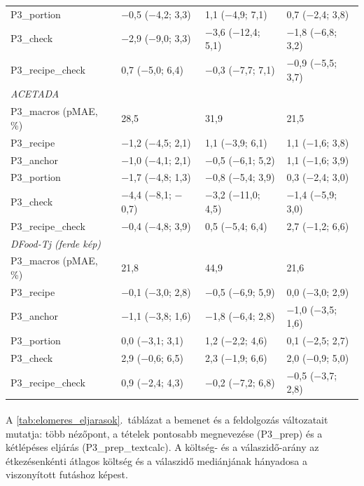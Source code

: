 \begin{table}[p]
{\begin{tabular}{llll}
P3\_portion & $-$0,5 ($-$4,2; 3,3) & 1,1 ($-$4,9; 7,1) & 0,7 ($-$2,4; 3,8) \\
P3\_check & $-$2,9 ($-$9,0; 3,3) & $-$3,6 ($-$12,4; 5,1) & $-$1,8 ($-$6,8; 3,2) \\
P3\_recipe\_check & 0,7 ($-$5,0; 6,4) & $-$0,3 ($-$7,7; 7,1) & $-$0,9 ($-$5,5; 3,7) \\
\hline
\multicolumn{4}{l}{\textit{ACETADA}} \\
P3\_macros (pMAE, \%) & 28,5 & 31,9 & 21,5 \\
P3\_recipe & $-$1,2 ($-$4,5; 2,1) & 1,1 ($-$3,9; 6,1) & 1,1 ($-$1,6; 3,8) \\
P3\_anchor & $-$1,0 ($-$4,1; 2,1) & $-$0,5 ($-$6,1; 5,2) & 1,1 ($-$1,6; 3,9) \\
P3\_portion & $-$1,7 ($-$4,8; 1,3) & $-$0,8 ($-$5,4; 3,9) & 0,3 ($-$2,4; 3,0) \\
P3\_check & $-$4,4 ($-$8,1; $-$0,7) & $-$3,2 ($-$11,0; 4,5) & $-$1,4 ($-$5,9; 3,0) \\
P3\_recipe\_check & $-$0,4 ($-$4,8; 3,9) & 0,5 ($-$5,4; 6,4) & 2,7 ($-$1,2; 6,6) \\
\hline
\multicolumn{4}{l}{\textit{DFood-Tj (ferde kép)}} \\
P3\_macros (pMAE, \%) & 21,8 & 44,9 & 21,6 \\
P3\_recipe & $-$0,1 ($-$3,0; 2,8) & $-$0,5 ($-$6,9; 5,9) & 0,0 ($-$3,0; 2,9) \\
P3\_anchor & $-$1,1 ($-$3,8; 1,6) & $-$1,8 ($-$6,4; 2,8) & $-$1,0 ($-$3,5; 1,6) \\
P3\_portion & 0,0 ($-$3,1; 3,1) & 1,2 ($-$2,2; 4,6) & 0,1 ($-$2,5; 2,7) \\
P3\_check & 2,9 ($-$0,6; 6,5) & 2,3 ($-$1,9; 6,6) & 2,0 ($-$0,9; 5,0) \\
P3\_recipe\_check & 0,9 ($-$2,4; 4,3) & $-$0,2 ($-$7,2; 6,8) & $-$0,5 ($-$3,7; 2,8) \\
\hline
\end{tabular}}
\end{table}

\paragraph{}A \ref{tab:elomeres_eljarasok}.~táblázat a bemenet és a feldolgozás változatait 
mutatja: több nézőpont, a tételek pontosabb megnevezése (P3\_prep) és a kétlépéses eljárás 
(P3\_prep\_textcalc). A költség- és a válaszidő-arány az étkezésenkénti átlagos költség és a 
válaszidő mediánjának hányadosa a viszonyított futáshoz képest.

